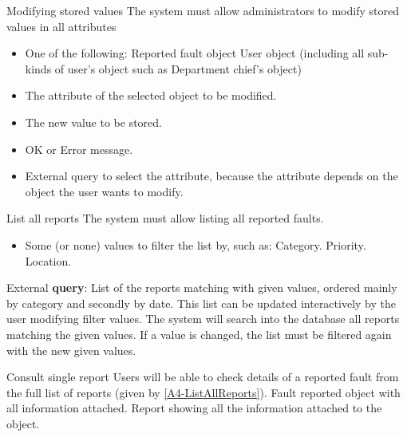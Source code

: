 \begin{requirement}{Modifying stored values}
\reqdesc The system must allow administrators to modify stored values in all attributes
\reqin 
\begin{itemize}
\item One of the following:
\subitem Reported fault object
\subitem User object (including all sub-kinds of user's object such as Department chief's object)
\item The attribute of the selected object to be modified.
\item The new value to be stored.
\end{itemize}

\reqout \begin{itemize}
	\item OK or Error message.
	\item External query to select the attribute, because the attribute depends on the object the user wants to modify.
\end{itemize}
\end{requirement}


\begin{requirement}{List all reports}\label{A4-ListAllReports}
\reqdesc The system must allow listing all reported faults.
\reqin 
\begin{itemize}
 	\item Some (or none) values to filter the list by, such as:
 		\subitem Category.
 		\subitem Priority.
 		\subitem Location.
 \end{itemize}
\reqout External \textbf{query}: List of the reports matching with given values, ordered mainly by category and secondly by date. This list can be updated interactively by the user modifying filter values.
\reqsteps The system will search into the database all reports matching the given values. If a value is changed, the list must be filtered again with the new given values.
\end{requirement}

\begin{requirement}{Consult single report}
\reqdesc Users will be able to check details of a reported fault from the full list of reports (given by \ref{A4-ListAllReports}).
\reqin Fault reported object with all information attached.
\reqout Report showing all the information attached to the object.
\end{requirement}

